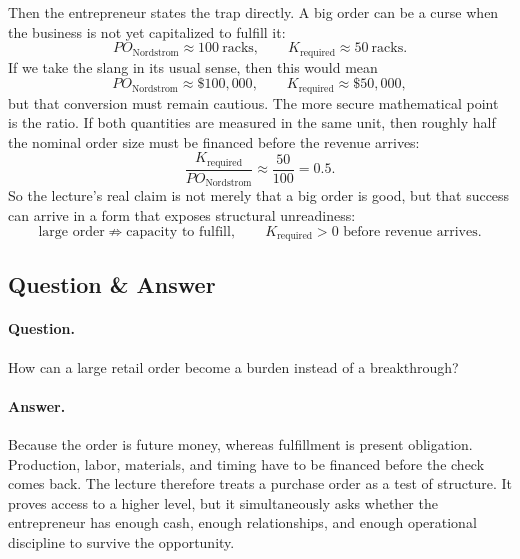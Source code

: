 Then the entrepreneur states the trap directly. A big order can be a curse when the business is not yet capitalized to fulfill it:
\begin{equation}
PO_{\text{Nordstrom}} \approx 100\ \text{racks},\qquad
K_{\text{required}} \approx 50\ \text{racks}.
\end{equation}
If we take the slang in its usual sense, then this would mean
\begin{equation}
PO_{\text{Nordstrom}} \approx \$100{,}000,\qquad
K_{\text{required}} \approx \$50{,}000,
\end{equation}
but that conversion must remain cautious. The more secure mathematical point is the ratio. If both quantities are measured in the same unit, then roughly half the nominal order size must be financed before the revenue arrives:
\begin{equation}
\frac{K_{\text{required}}}{PO_{\text{Nordstrom}}}
\approx \frac{50}{100}
= 0.5.
\end{equation}
So the lecture's real claim is not merely that a big order is good, but that success can arrive in a form that exposes structural unreadiness:
\begin{equation}
\text{large order} \not\Rightarrow \text{capacity to fulfill},\qquad
K_{\text{required}} > 0 \text{ before revenue arrives}.
\end{equation}

\subsection{Question \& Answer}

\paragraph{Question.} How can a large retail order become a burden instead of a breakthrough?

\paragraph{Answer.} Because the order is future money, whereas fulfillment is present obligation. Production, labor, materials, and timing have to be financed before the check comes back. The lecture therefore treats a purchase order as a test of structure. It proves access to a higher level, but it simultaneously asks whether the entrepreneur has enough cash, enough relationships, and enough operational discipline to survive the opportunity.

